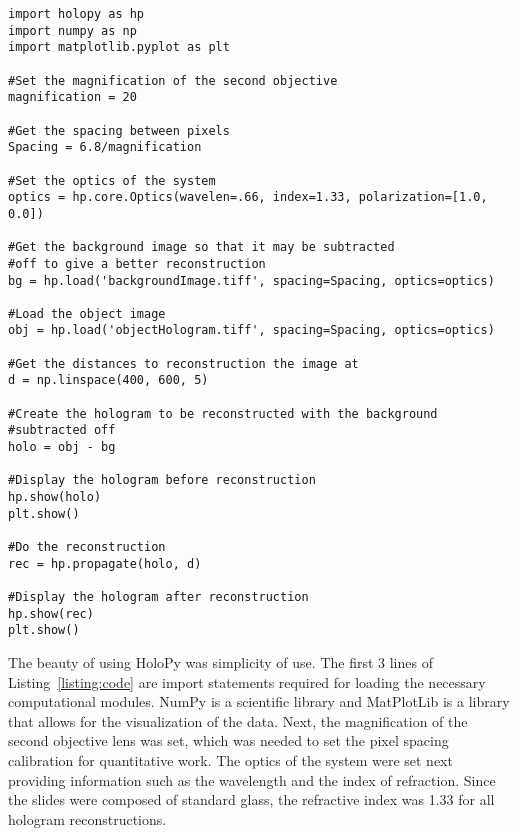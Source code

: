 \begin{Code}[scale=0.75,htbp!]
    \centering
\begin{lstlisting}[caption=Code for a general reconstruction, label=listing:code]
import holopy as hp
import numpy as np
import matplotlib.pyplot as plt

#Set the magnification of the second objective
magnification = 20

#Get the spacing between pixels
Spacing = 6.8/magnification

#Set the optics of the system
optics = hp.core.Optics(wavelen=.66, index=1.33, polarization=[1.0, 0.0])

#Get the background image so that it may be subtracted 
#off to give a better reconstruction
bg = hp.load('backgroundImage.tiff', spacing=Spacing, optics=optics)

#Load the object image
obj = hp.load('objectHologram.tiff', spacing=Spacing, optics=optics)

#Get the distances to reconstruction the image at
d = np.linspace(400, 600, 5)

#Create the hologram to be reconstructed with the background 
#subtracted off
holo = obj - bg

#Display the hologram before reconstruction
hp.show(holo)
plt.show()

#Do the reconstruction
rec = hp.propagate(holo, d)

#Display the hologram after reconstruction
hp.show(rec)
plt.show()

\end{lstlisting}
\end{Code}

The beauty of using HoloPy was simplicity of use. The first 3
lines of Listing~\ref{listing:code} are import statements required for loading
the necessary computational modules.
NumPy is a scientific library and MatPlotLib is a
library that allows for the visualization of the data. Next, the magnification
of the second objective lens was set, which was needed to set the pixel spacing
calibration for quantitative work.
The optics of the system were set next providing
information such as the wavelength and the index of
refraction. Since the slides were composed of standard glass, the refractive
index was 1.33 for all hologram reconstructions.

